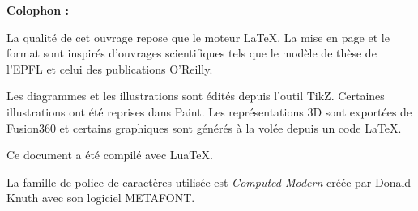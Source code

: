 \clearpage
\Large\textbf{Colophon :}\par\normalsize
\thispagestyle{empty}
La qualité de cet ouvrage repose que le moteur \LaTeX. La mise en page et le format sont inspirés d'ouvrages scientifiques tels que le modèle de thèse de l'EPFL et celui des publications O'Reilly.

Les diagrammes et les illustrations sont édités depuis l'outil TikZ. Certaines illustrations ont été reprises dans Paint. Les représentations 3D sont exportées de Fusion360 et certains graphiques sont générés à la volée depuis un code LaTeX.

Ce document a été compilé avec \mbox{Lua\TeX}.

La famille de police de caractères utilisée est \emph{Computed Modern} créée par Donald Knuth avec son logiciel METAFONT.

\vfil

